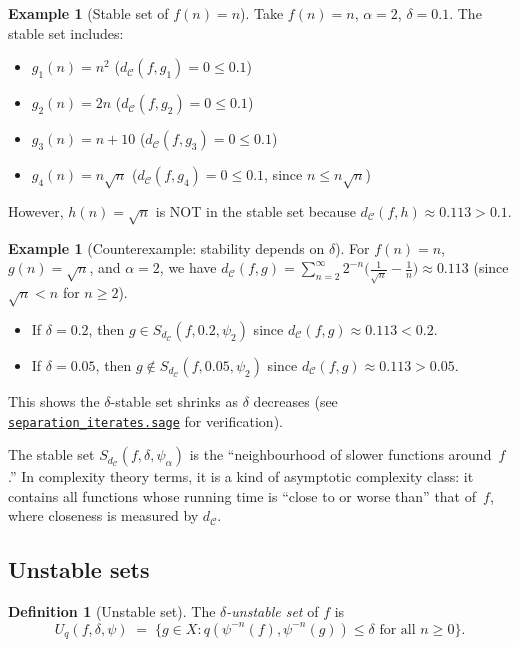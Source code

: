 \documentclass[11pt,a4paper]{article}
\newcommand{\repourl}{https://github.com/gabayae/expansive-homeomorphisms-complexity-qmetric}
\theoremstyle{plain}
\theoremstyle{definition}
\newtheorem{definitioninner}[theoreminner]{Definition}
\newtheorem{exampleinner}[theoreminner]{Example}
\newenvironment{definition}[1][]{\begin{definitioninner}[#1]}{\end{definitioninner}}
\newenvironment{example}[1][]{\begin{exampleinner}[#1]}{\end{exampleinner}}
\newcommand{\C}{\mathcal{C}}
\begin{document}
\begin{example}[Stable set of $f(n)=n$]\label{ex:stable-lin}
Take $f(n)=n$, $\alpha=2$, $\delta=0.1$. The stable set includes:
\begin{itemize}
\item $g_1(n)=n^2$ ($d_\C(f,g_1)=0\le 0.1$)
\item $g_2(n)=2n$ ($d_\C(f,g_2)=0\le 0.1$)
\item $g_3(n)=n+10$ ($d_\C(f,g_3)=0\le 0.1$)
\item $g_4(n)=n\sqrt{n}$ ($d_\C(f,g_4)=0\le 0.1$, since $n\le n\sqrt{n}$)
\end{itemize}
However, $h(n)=\sqrt{n}$ is NOT in the stable set because
$d_\C(f,h)\approx 0.113 > 0.1$.
\end{example}

\begin{example}[Counterexample: stability depends on $\delta$]\label{ex:counter-stable}
For $f(n)=n$, $g(n)=\sqrt{n}$, and $\alpha=2$, we have
$d_\C(f,g)=\sum_{n=2}^\infty 2^{-n}\bigl(\frac{1}{\sqrt{n}}-\frac{1}{n}\bigr)
\approx 0.113$ (since $\sqrt{n}<n$ for $n\ge 2$).
\begin{itemize}
\item If $\delta=0.2$, then $g\in S_{d_\C}(f,0.2,\psi_2)$ since $d_\C(f,g)\approx 0.113 < 0.2$.
\item If $\delta=0.05$, then $g\notin S_{d_\C}(f,0.05,\psi_2)$ since $d_\C(f,g)\approx 0.113 > 0.05$.
\end{itemize}
This shows the $\delta$-stable set shrinks as $\delta$ decreases
(see \href{\repourl/blob/main/code/sagemath/separation_iterates.sage}{\texttt{separation\_iterates.sage}}
for verification).
\end{example}

\begin{insightbox}
The stable set $S_{d_\C}(f,\delta,\psi_\alpha)$ is the
``neighbourhood of slower functions around~$f$.''  In complexity
theory terms, it is a kind of asymptotic complexity class: it
contains all functions whose running time is ``close to or worse
than'' that of~$f$, where closeness is measured by $d_\C$.
\end{insightbox}


\subsection{Unstable sets}

\begin{definition}[Unstable set]\label{def:unstable}
The \emph{$\delta$-unstable set} of $f$ is
\[
  U_q(f,\delta,\psi)
  \;=\; \{g\in X : q(\psi^{-n}(f),\psi^{-n}(g))\le\delta
    \text{ for all }n\ge 0\}.
\]
\end{definition}
\end{document}
